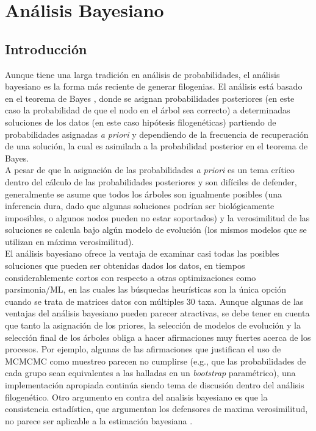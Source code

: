\chapter{An\'alisis Bayesiano}
\section*{Introducci\'on}
Aunque tiene una larga tradici\'on en an\'alisis de probabilidades, el an\'alisis bayesiano es la forma m\'as reciente de generar filogenias.  El an\'alisis est\'a basado en el teorema de Bayes \cite{Bayes1763}, donde se asignan probabilidades posteriores (en este caso la probabilidad de que el nodo en el \'arbol sea correcto) a determinadas soluciones de los datos (en este caso hip\'otesis filogen\'eticas) partiendo de probabilidades asignadas \textit{a priori} y dependiendo de la frecuencia de recuperaci\'on de una soluci\'on, la cual es asimilada a la probabilidad posterior en el teorema de Bayes.\\
A pesar de que la asignaci\'on de las probabilidades  \textit{a priori} es un tema cr\'itico dentro del c\'alculo de las probabilidades posteriores y son dif\'iciles de defender, generalmente se asume
que todos los \'arboles son igualmente posibles (una inferencia dura, dado que algunas soluciones 
podr\'ian ser biol\'ogicamente imposibles, o algunos nodos pueden no estar soportados) y la verosimilitud de las soluciones se calcula bajo alg\'un modelo de evoluci\'on (los mismos modelos que se utilizan en m\'axima verosimilitud).\\
El an\'alisis bayesiano ofrece la ventaja de examinar casi todas las posibles soluciones que pueden ser obtenidas dados los datos, en tiempos considerablemente cortos con respecto a otras optimizaciones como parsimonia/ML, en las cuales las b\'usquedas heur\'isticas son la \'unica opci\'on cuando se trata de matrices datos con m\'ultiples 30 taxa. Aunque algunas de las ventajas del an\'alisis bayesiano pueden parecer atractivas, se debe tener en cuenta que tanto la asignaci\'on de los priores, la selecci\'on de modelos de evoluci\'on y la selecci\'on final de los \'arboles obliga a hacer afirmaciones muy fuertes acerca de los procesos. Por ejemplo, algunas de las afirmaciones que justifican el uso de MCMCMC como muestreo parecen no cumplirse (e.g., que las probabilidades de cada grupo sean equivalentes a las halladas en un \textit{bootstrap} param\'etrico), una implementaci\'on apropiada contin\'ua siendo tema de discusi\'on dentro del an\'alisis filogen\'etico. Otro argumento en contra del analisis bayesiano es que la consistencia estad\'istica, que argumentan los defensores de maxima verosimilitud, no parece ser aplicable a la estimaci\'on bayesiana \cite{Goloboff2005}.
\\



